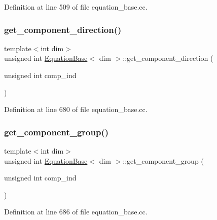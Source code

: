 Definition at line 509 of file equation\+\_\+base.\+cc.

\mbox{\label{class_equation_base_a4feaa86bdd6e84c4fc9195df67890c6a}} 
\subsubsection{\texorpdfstring{get\+\_\+component\+\_\+direction()}{get\_component\_direction()}}
{\footnotesize\ttfamily template$<$int dim$>$ \\
unsigned int \hyperlink{class_equation_base}{Equation\+Base}$<$ dim $>$\+::get\+\_\+component\+\_\+direction (\begin{DoxyParamCaption}\item[{unsigned int}]{comp\+\_\+ind }\end{DoxyParamCaption})\hspace{0.3cm}{\ttfamily [virtual]}}



Definition at line 680 of file equation\+\_\+base.\+cc.

\mbox{\label{class_equation_base_a43a783f117149eac90a770d471cd7671}} 
\subsubsection{\texorpdfstring{get\+\_\+component\+\_\+group()}{get\_component\_group()}}
{\footnotesize\ttfamily template$<$int dim$>$ \\
unsigned int \hyperlink{class_equation_base}{Equation\+Base}$<$ dim $>$\+::get\+\_\+component\+\_\+group (\begin{DoxyParamCaption}\item[{unsigned int}]{comp\+\_\+ind }\end{DoxyParamCaption})\hspace{0.3cm}{\ttfamily [virtual]}}



Definition at line 686 of file equation\+\_\+base.\+cc.


